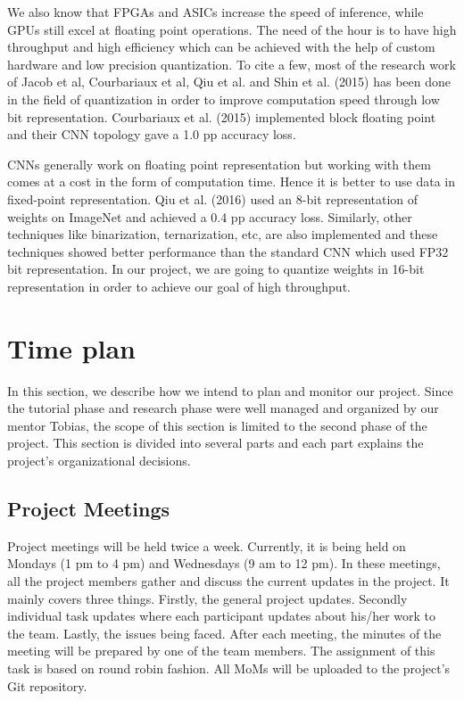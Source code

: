 \documentclass[titlepage]{report}
\begin{document}
 We also know that FPGAs and ASICs increase the speed of inference, while GPUs still excel at floating point operations. The need of the hour is to have high throughput and high efficiency which can be achieved with the help of custom hardware and low precision quantization. To cite a few, most of the research work of Jacob et al, Courbariaux et al, Qiu et al. and Shin et al. (2015) has been done in the field of quantization in order to improve computation speed through low bit representation.  Courbariaux et al. (2015) implemented block floating point and their CNN topology gave a 1.0 pp accuracy loss. 

CNNs generally work on floating point representation but working with them comes at a cost in the form of computation time. Hence it is better to use data in fixed-point representation. Qiu et al. (2016) used an 8-bit representation of weights on ImageNet and achieved a 0.4 pp accuracy loss. Similarly, other techniques like binarization, ternarization, etc, are also implemented and these techniques showed better performance than the standard CNN which used FP32 bit representation. In our project, we are going to quantize weights in 16-bit representation in order to achieve our goal of high throughput.




\chapter{Time plan}
In this section, we describe how we intend to plan and monitor our project. Since the tutorial phase and research phase were well managed and organized by our mentor Tobias, the scope of this section is limited to the second phase of the project. This section is divided into several parts and each part explains the project’s organizational decisions. 

\section{Project Meetings}
Project meetings will be held twice a week. Currently, it is being held on Mondays (1 pm to 4 pm) and Wednesdays (9 am to 12 pm). In these meetings, all the project members gather and discuss the current updates in the project. It mainly covers three things. Firstly, the general project updates. Secondly individual task updates where each participant updates about his/her work to the team. Lastly, the issues being faced. 
After each meeting, the minutes of the meeting will be prepared by one of the team members. The assignment of this task is based on round robin fashion. All MoMs will be uploaded to the project’s Git repository.
\end{document}
